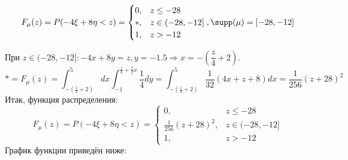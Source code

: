 \[
F_{\mu} (z) = P(-4\xi + 8 \eta < z) =
\begin{cases}
	0, &z \le -28 \\
	*, &z \in (-28, -12] \\
	1, &z > -12
\end{cases}, \supp (\mu) = [-28, -12]
\]
\begin{figure}[H]
\end{figure}
При $z \in (-28, -12]: -4x + 8y = z, y = -1.5 \Rightarrow x = -\left(\dfrac{z}{4}+2\right)$.
\[ * = F_{\mu}(z) = \int_{-\left(\frac{z}{4}+2\right)}^{5} dx \int_{-1}^{\frac{z}{8} + \frac{1}{2}x} \frac{1}{4} dy = \int_{-\left(\frac{z}{4}+2\right)}^{5} \frac{1}{32} (4x + z + 8) dx = \frac{1}{256} (z + 28)^2 \]
Итак, функция распределения:
\[
F_{\mu} (z) = P(-4\xi + 8 \eta < z) =
\begin{cases}
	0, &z \le -28 \\
	\frac{1}{256} (z + 28)^2, &z \in (-28, -12] \\
	1, &z > -12
\end{cases}
\]
График функции приведён ниже:
\begin{figure}[H]
\end{figure}
